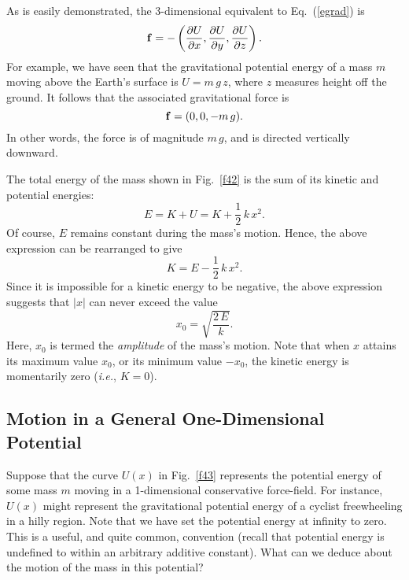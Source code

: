 As is easily demonstrated, the 3-dimensional equivalent to Eq.~(\ref{egrad}) is
\begin{equation}
{\bf f} = -\left(\frac{\partial U}{\partial x}, \frac{\partial U}{\partial y},
\frac{\partial U}{\partial z}\right).
\end{equation}
For example, we have seen that the gravitational potential energy of
a mass $m$ moving above the Earth's surface is $U=m\,g\,z$,
where $z$ measures height off the ground. It follows that the
associated gravitational force is
\begin{equation}
{\bf f} = (0,0,-m\,g).
\end{equation}
In other words, the force is of magnitude $m\, g$, and is directed
vertically downward.

The total energy of the mass shown in Fig.~\ref{f42} is the sum of its kinetic and
potential energies:
\begin{equation}
E = K + U = K + \frac{1}{2}\,k\,x^2.
\end{equation}
Of course, $E$ remains constant during the
mass's motion. Hence, the above expression can be rearranged
to give
\begin{equation}\label{epotn1}
K = E - \frac{1}{2}\,k\,x^2.
\end{equation}
 Since it is impossible
for a kinetic energy
to be  negative, the above expression
suggests that $|x|$ can never exceed the value 
\begin{equation}
x_0 = \sqrt{\frac{2\,E}{k}}.
\end{equation}
Here, $x_0$ is termed the {\em amplitude} of the mass's motion. Note that when
$x$ attains its maximum value $x_0$, or its minimum value $-x_0$, the 
kinetic energy is momentarily zero ({\em i.e.}, $K=0$).

\subsection{Motion in a General One-Dimensional Potential}\label{gpotn}
Suppose that the curve $U(x)$ in Fig.~\ref{f43} represents the potential
energy of some mass $m$ moving in a 1-dimensional conservative force-field.
For instance, $U(x)$ might represent the gravitational potential energy 
of a cyclist freewheeling in a hilly region. Note that we have set the
potential energy at infinity to zero. This is a useful, and quite common,  convention (recall that
potential energy is undefined to within an arbitrary additive constant).
What can we deduce about the motion of the mass in this potential?

